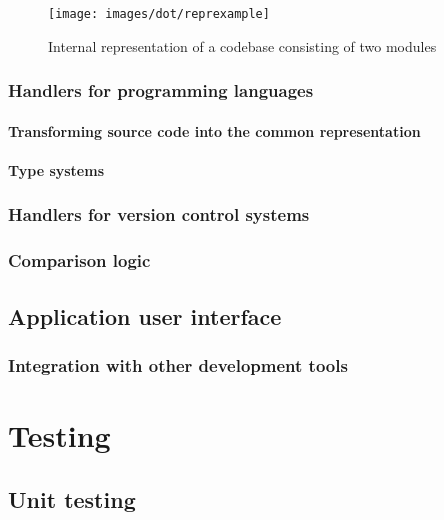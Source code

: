 \documentclass{l4proj}
\begin{document}
\begin{figure}[H]
\centering
\texttt{[image: images/dot/reprexample]}
\caption{Internal representation of a codebase consisting of two modules}
\label{RepresentationExample}
\end{figure}
\clearpage

\subsection{Handlers for programming languages}
\label{LanguageHandlers}

\subsubsection{Transforming source code into the common representation}


\subsubsection{Type systems}
\label{TypeSystems}


\subsection{Handlers for version control systems}
\label{VCSHandlers}

\subsection{Comparison logic}
\label{Logic}

\section{Application user interface}

\subsection{Integration with other development tools}

\chapter{Testing}

\section{Unit testing}
\end{document}
